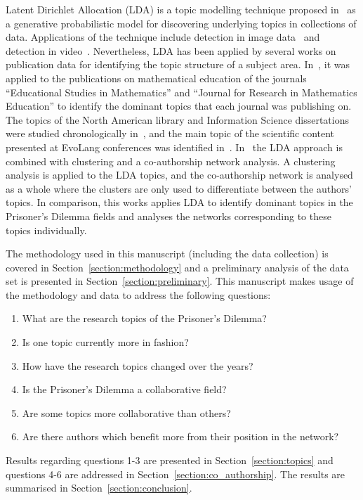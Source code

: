 Latent Dirichlet Allocation (LDA) is a topic modelling technique proposed
in~\cite{Blei2003} as a generative probabilistic model for discovering
underlying topics in collections of data.
Applications of the technique include detection in image data~\cite{Agarwal2008,
Coelho2010} and detection in video~\cite{Niebles2008, Wang2008}. Nevertheless,
LDA has been applied by several works on publication data for identifying the
topic structure of a subject area. In~\cite{Inglis2018}, it was applied to the
publications on mathematical education of the journals ``Educational Studies in
Mathematics'' and ``Journal for Research in Mathematics Education'' to
identify the dominant topics that each journal was publishing on. The topics of
the North American library and Information Science dissertations were 
studied chronologically in~\cite{Sugimoto2011}, and the main topic of the
scientific content presented at EvoLang conferences was identified
in~\cite{Bergmann2018}. In~\cite{Bergmann2018} the LDA approach is combined with
clustering and a co-authorship network analysis. A clustering analysis is
applied to the LDA topics, and the co-authorship network is analysed as a whole
where the clusters are only used to differentiate between the authors' topics.
In comparison, this works applies
LDA to identify dominant topics in the Prisoner's Dilemma fields and analyses
the networks corresponding to these topics individually.

The methodology used in this manuscript (including the data collection) is
covered in Section~\ref{section:methodology} and a preliminary analysis of the
data set is presented in Section~\ref{section:preliminary}. This manuscript
makes usage of the methodology and data to address the following questions:

\begin{enumerate}
    \item What are the research topics of the Prisoner's Dilemma?
    \item Is one topic currently more in fashion?
    \item How have the research topics changed over the years?
    \item Is the Prisoner's Dilemma a collaborative field?
    \item Are some topics more collaborative than others?
    \item Are there authors which benefit more from their position in the
    network?
\end{enumerate}

Results regarding questions 1-3 are presented in Section~\ref{section:topics}
and questions 4-6 are addressed in Section~\ref{section:co_authorship}. The
results are summarised in Section~\ref{section:conclusion}.

